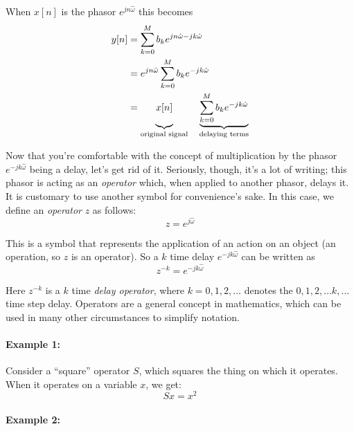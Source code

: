When $x[n]$ is the phasor $e^{jn\hat{\omega}}$ this becomes
\begin{align}
y[n] &= \sum_{k=0}^M b_k e^{jn\hat{\omega} - jk\hat{\omega}}\\
     &= e^{jn\hat{\omega}}\sum_{k=0}^M b_k e^{-jk\hat{\omega}}\\
     &= \underbrace{x[n]\vphantom{\sum_{k=0}^M b_k
          e^{-jk\hat{\omega}}}}_{\text{original signal}}
        \quad\underbrace{\sum_{k=0}^M b_k
          e^{-jk\hat{\omega}}}_{\text{delaying terms}}
\label{eq:ff-manyk}
\end{align}

Now that you're comfortable with the concept of multiplication by the
phasor $e^{-jk\hat{\omega}}$ being a delay, let's get rid of
it. Seriously, though, it's a lot of writing; this phasor is acting as
an \emph{operator} which, when applied to another phasor, delays
it. It is customary to use another symbol for convenience's sake. In this case, we
define an \emph{operator} $z$ as follows:
\begin{equation}
z = e^{j\hat{\omega}}
\end{equation}

This is a symbol that represents the application of an action on an
object (an operation, so $z$ is an operator). So a $k$ time delay
$e^{-jk\hat{\omega}}$ can be written as
\begin{equation}
z^{-k} = e^{-jk\hat{\omega}}
\end{equation}

Here $z^{-k}$ is a $k$ time \emph{delay operator}, where $k=0, 1, 2,
\ldots $ denotes the $0, 1, 2, \ldots k, \ldots$ time step
delay. Operators are a general concept in mathematics, which can be
used in many other circumstances to simplify notation.

\paragraph*{Example 1:}

Consider a ``square'' operator $S$, which squares the thing on which
it operates.  When it operates on a variable $x$, we get:
\begin{equation*}
Sx = x^2
\end{equation*}

\paragraph*{Example 2:}

